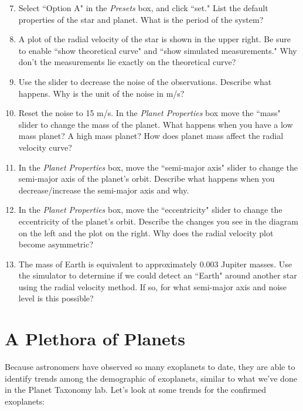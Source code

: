 \documentclass[12pt]{article}
\begin{document}
\begin{enumerate}
\setcounter{enumi}{6}
\item Select ``Option A" in the \emph{Presets} box, and click ``set." List the default properties of the star and planet.  What is the period of the system?

\item A plot of the radial velocity of the star is shown in the upper right.  Be sure to enable ``show theoretical curve" and ``show simulated measurements."  Why don't the measurements lie exactly on the theoretical curve?

\item Use the slider to decrease the noise of the observations.  Describe what happens.  Why is the unit of the noise in m/s?

\item Reset the noise to 15 m/s.  In the \emph{Planet Properties} box move the ``mass" slider to change the mass of the planet.  What happens when you have a low mass planet? A high mass planet? How does planet mass affect the radial velocity curve?

\item In the \emph{Planet Properties} box, move the ``semi-major axis" slider to change the semi-major axis of the planet's orbit.  Describe what happens when you decrease/increase the semi-major axis and why.

\item In the \emph{Planet Properties} box, move the ``eccentricity" slider to change the eccentricity of the planet's orbit.  Describe the changes you see in the diagram on the left and the plot on the right.  Why does the radial velocity plot become asymmetric?

\item The mass of Earth is equivalent to approximately 0.003 Jupiter masses. Use the simulator to determine if we could detect an ``Earth" around another star using the radial velocity method. If so, for what semi-major axis and noise level is this possible?

\end{enumerate}



\section{A Plethora of Planets}

Because astronomers have observed so many exoplanets to date, they are able to identify trends among the demographic of exoplanets, similar to what we've done in the Planet Taxonomy lab. Let's look at some trends for the confirmed exoplanets:
\end{document}
